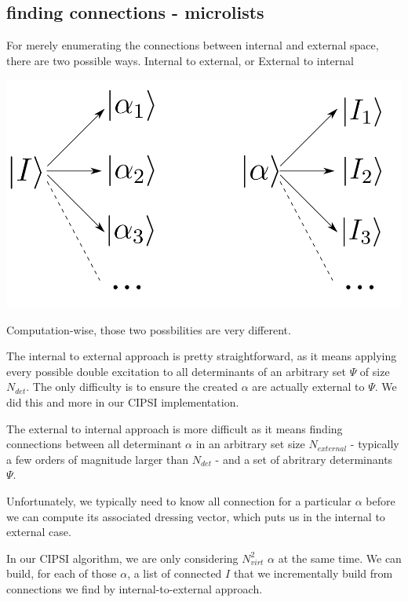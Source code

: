 \documentclass[./thesis.tex]{subfiles}
\begin{document}
\subsection{finding connections - microlists}

For merely enumerating the connections between internal and external space, there are two possible ways.
Internal to external, or External to internal
	\begin{center}
		\includegraphics[width=0.5\columnwidth]{figures/matrix_dressing/interactions}
	\end{center}

Computation-wise, those two possbilities are very different.

The internal to external approach is pretty straightforward, as it means applying every possible double excitation to all determinants of an arbitrary set $\Psi$ of size $N_{det}$. The only difficulty is to ensure the created $\alpha$ are actually external to $\Psi$. We did this and more in our CIPSI implementation.

The external to internal approach is more difficult as it means finding connections between all determinant $\alpha$ in an arbitrary set size $N_{external}$ - typically a few orders of magnitude larger than $N_{det}$ - and a set of abritrary determinants $\Psi$. 

Unfortunately, we typically need to know all connection for a particular $\alpha$ before we can compute its associated dressing vector, which puts us in the internal to external case.

In our CIPSI algorithm, we are only considering $N_{virt}^2$ $\alpha$ at the same time. We can build, for each of those $\alpha$, a list of connected $I$ that we incrementally build from connections we find by internal-to-external approach.
\end{document}
